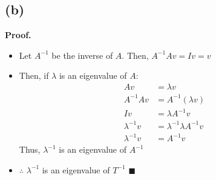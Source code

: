 \documentclass{article}
\begin{document}
\subsection*{(b)}
\textbf{Proof.}
\begin{itemize}
	\item Let $A^{-1}$ be the inverse of $A$. Then, $A^{-1}A v=Iv=v$
	\item Then, if $\lambda$ is an eigenvalue of $A$:
		\begin{align*}
			A v 			&= \lambda v 						\\
			A^{-1}Av 		&= A^{-1}(\lambda v )				\\
			I v 			&= \lambda A^{-1} v 				\\
			\lambda^{-1} v 	&= \lambda^{-1}\lambda A^{-1} v		\\
			\lambda^{-1} v 	&= A^{-1} v							
		\end{align*}
		Thus, $\lambda^{-1}$ is an eigenvalue of $A^{-1}$
	\item $\therefore$ $\lambda^{-1}$ is an eigenvalue of $T^{-1}$ $\blacksquare$
\end{itemize}
\end{document}
